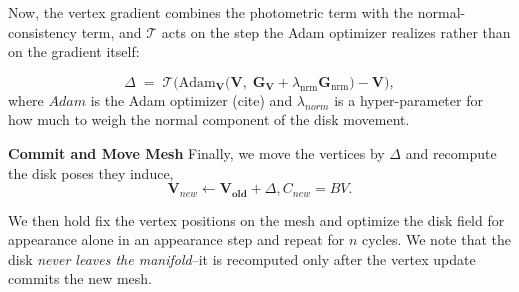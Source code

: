 Now, the vertex gradient combines the photometric term with the
normal-consistency term, and $\mathcal{T}$ acts on the step the Adam optimizer
realizes rather than on the gradient itself:

\begin{equation}
\label{eq:step}
  \Delta \;=\; \mathcal{T}\Big(
    \mathrm{Adam}_{\mathbf{V}}\big(\mathbf{V},\;
      \mathbf{G}_{\mathbf{V}} + \lambda_{\mathrm{nrm}}\mathbf{G}_{\mathrm{nrm}}
    \big) - \mathbf{V}
  \Big),
\end{equation}
where $Adam$ is the Adam optimizer (cite) and $\lambda_{norm}$ is a hyper-parameter for how much to weigh the normal component of the disk movement.
%



\textbf{Commit and Move Mesh} Finally, we move the vertices by $\Delta$ and recompute
the disk poses they induce, 
\begin{equation}
     \mathbf{V} _{new}\leftarrow \mathbf{V_{old}} + \Delta, C_{new} = BV .
\end{equation}


We then hold fix the vertex positions on the mesh and optimize the disk field for appearance alone in an appearance step and repeat for $n$ cycles. We note that the disk \emph{never leaves the manifold}--it is recomputed only after the vertex update commits the new mesh.

